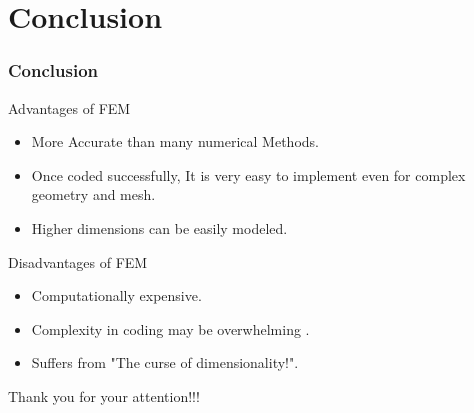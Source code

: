 \documentclass[9pt]{beamer}
\begin{document}
\section{Conclusion}
\begin{frame}
\frametitle{Conclusion}
\begin{block}{Advantages of FEM}
\begin{itemize}
\item More Accurate than many numerical Methods.
\item Once coded successfully, It is very easy to implement even for complex geometry and mesh.
\item Higher dimensions can be easily modeled.
\end{itemize}

\end{block}

\begin{block}{Disadvantages of FEM}
\begin{itemize}
\item Computationally expensive.
\item Complexity in coding may be overwhelming .
\item Suffers from "The curse of dimensionality!".

\end{itemize}

\end{block}
\end{frame}

\begin{frame}
Thank you for your attention!!!
\end{frame}
\end{document}
